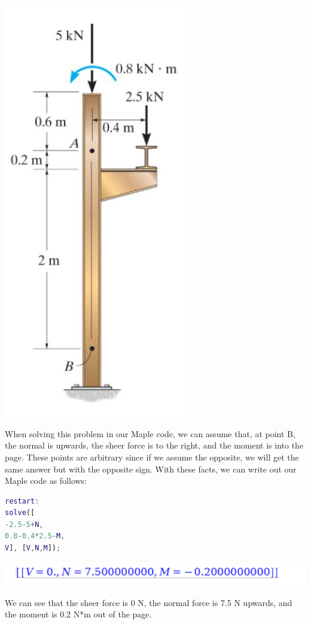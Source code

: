 \documentclass{article}[14pt, letterpaper, Times New Roman]
\begin{document}
\includegraphics[width=8cm]{l12-pbq2.png}

When solving this problem in our Maple code, we can assume that, at point B, the normal is upwards, the sheer force is to the right, and the moment is into the page.
These points are arbitrary since if we assume the opposite, we will get the same answer but with the opposite sign.
With these facts, we can write out our Maple code as follows:

\begin{lstlisting}[language=matlab]
restart:
solve([
-2.5-5+N,
0.8-0.4*2.5-M,
V], [V,N,M]);
\end{lstlisting}

\includegraphics[width=15cm]{l12-pbq-o.png}

We can see that the sheer force is 0 N, the normal force is 7.5 N upwards, and the moment is 0.2 N*m out of the page.
\end{document}
